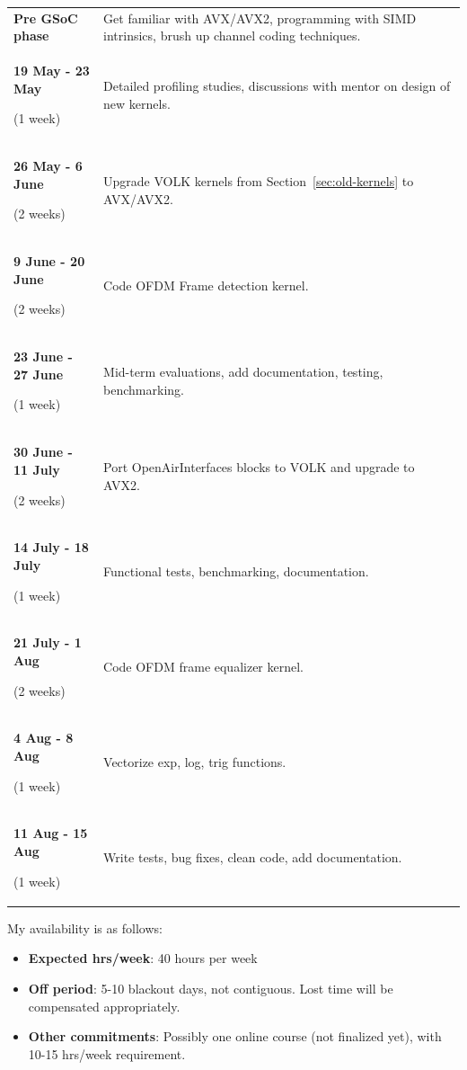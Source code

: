 \documentclass[a4paper,12pt,oneside]{article}
\begin{document}
\begin{table}[H]
\centering
\begin{tabular}{>{\bfseries}p{3.8cm} p{10.2cm}}
\hline
Pre GSoC phase & Get familiar with AVX/AVX2, programming with SIMD intrinsics, brush up channel coding techniques. \\ 
19 May - 23 May \par \textnormal{(1 week)} & Detailed profiling studies, discussions with mentor on design of new kernels. \\
26 May - 6 June \par \textnormal{(2 weeks)} & Upgrade VOLK kernels from Section~\ref{sec:old-kernels} to AVX/AVX2. \\
9 June - 20 June \par \textnormal{(2 weeks)} & Code OFDM Frame detection kernel. \\ 
23 June - 27 June \par \textnormal{(1 week)} & Mid-term evaluations, add documentation, testing, benchmarking. \\ 
30 June - 11 July \par \textnormal{(2 weeks)} & Port OpenAirInterfaces blocks to VOLK and upgrade to AVX2. \\ 
14 July - 18 July \par \textnormal{(1 week)} & Functional tests, benchmarking, documentation. \\ 
21 July - 1 Aug \par \textnormal{(2 weeks)} & Code OFDM frame equalizer kernel. \\ 
4 Aug - 8 Aug \par \textnormal{(1 week)} & Vectorize exp, log, trig functions. \\ 
11 Aug - 15 Aug \par \textnormal{(1 week)} & Write tests, bug fixes, clean code, add documentation. \\ 
\hline
\end{tabular}
\end{table}

My availability is as follows:

\begin{itemize}
\item \textbf{Expected hrs/week}: 40 hours per week
\item \textbf{Off period}: 5-10 blackout days, not contiguous. Lost time will be compensated appropriately.
\item \textbf{Other commitments}: Possibly one online course (not finalized yet), with 10-15 hrs/week requirement.
\end{itemize}
\end{document}
